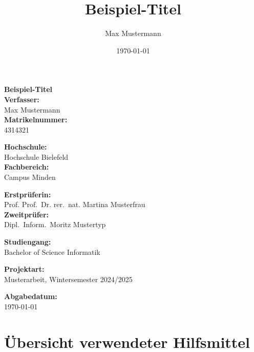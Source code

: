 \documentclass[a4paper,12pt]{scrreprt}
\title{Beispiel-Titel}
\author{Max Mustermann}
\date{\today}
\begin{document}
    

    \begin{titlepage}
        \centering
        {\LARGE \textbf{\textsf{Beispiel-Titel}}} \\
        [1cm]

        \textbf{Verfasser: } \\
        Max Mustermann \\
        [0.5em]
        \textbf{Matrikelnummer: } \\
        4314321 \\
        \vspace{0.5cm}

        \textbf{Hochschule: } \\
        Hochschule Bielefeld \\
        [0.5em]
        \textbf{Fachbereich: } \\
        Campus Minden \\
        \vspace{0.5cm}

        \textbf{Erstprüferin: } \\
        Prof.
        Prof.\ Dr. rer.\ nat.
        Martina Musterfrau \\
        [0.5em]
        \textbf{Zweitprüfer:} \\
        Dipl.\ Inform.\ Moritz Mustertyp \\
        \vspace{0.5cm}

        \textbf{Studiengang:} \\
        Bachelor of Science Informatik \\
        \vspace{0.5cm}

        \textbf{Projektart:} \\
        Musterarbeit, Wintersemester 2024/2025 \\
        \vspace{0.5cm}

        \textbf{Abgabedatum:} \\
        \today \\
        \vspace{1cm}

    \end{titlepage}

%    
    \tableofcontents

    
    
    
    
    
    

    \printglossary

    
    

    \chapter*{Übersicht verwendeter Hilfsmittel}\label{ch:liste-genutzter-hilfsmittel}
\end{document}
